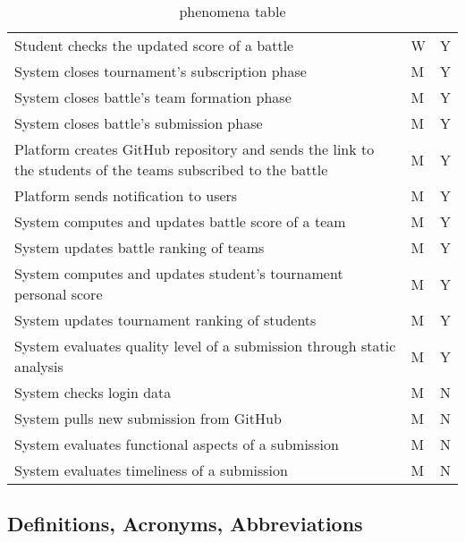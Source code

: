 \begin{table}[H]
\begin{tabular}{|p{9.5cm}|p{2cm}|p{1.5cm}|}
        Student checks the updated score of a battle & W & Y \\
        System closes tournament's subscription phase & M & Y \\
        System closes battle's team formation phase & M & Y \\
        System closes battle's submission phase & M & Y \\
        Platform creates GitHub repository and sends the link to the students of the teams subscribed to the battle & M & Y \\
        Platform sends notification to users & M & Y \\
        System computes and updates battle score of a team & M & Y \\
        System  updates battle ranking of teams & M & Y \\
        System computes and updates student's tournament personal score & M & Y \\
        System  updates tournament ranking of students & M & Y \\
        System evaluates quality level of a submission through static analysis & M & Y \\
        System checks login data & M & N \\
        System pulls new submission from GitHub & M & N \\
        System evaluates functional aspects of a submission & M & N \\
        System evaluates timeliness of a submission & M & N \\
        \hline
    \end{tabular}
    \caption{phenomena table}
\end{table}
\newpage
\subsection{Definitions, Acronyms, Abbreviations}
